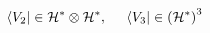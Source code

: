 \begin{equation}
\langle V_2 |\in {\cal H}^* \otimes {\cal H}^*, \;\;\;\;\;
\langle V_3 | \in \left({\cal H}^* \right)^3
\label{eq:23-vertices}
\end{equation}

